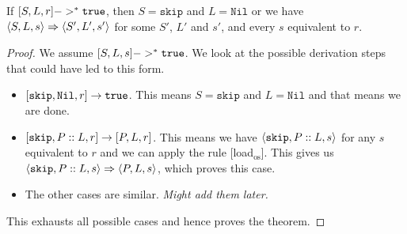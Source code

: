 \begin{theorem}
\label{progress}
If $[ S, L, r ] ->^* \texttt{true}$, then $S = \texttt{skip}$ and $L = \texttt{Nil}$ or we have $\langle S, L, s \rangle \Rightarrow \langle S', L', s' \rangle$ for some $S'$, $L'$ and $s'$, and every $s$ equivalent to $r$.
\end{theorem}

\begin{proof}
We assume $[ S, L, s ] ->^* \texttt{true}$. We look at the possible derivation steps that could have led to this form. 
\begin{itemize}[noitemsep]
    \item $[ \texttt{skip}, \texttt{Nil}, r ] \to \texttt{true}$. This means $S = \texttt{skip}$ and $L = \texttt{Nil}$ and that means we are done.
    \item $[ \texttt{skip}, P::L,  r ] \to [ P, L, r ]$. This means we have $\langle \texttt{skip}, P::L, s \rangle$ for any $s$ equivalent to $r$ and we can apply the rule [load$_{\textrm{os}}$]. This gives us $\langle \texttt{skip}, P::L, s \rangle \Rightarrow \langle P, L, s \rangle$, which proves this case. 
     \item The other cases are similar. \emph{Might add them later.}
\end{itemize}
This exhausts all possible cases and hence proves the theorem.
\end{proof}

 



